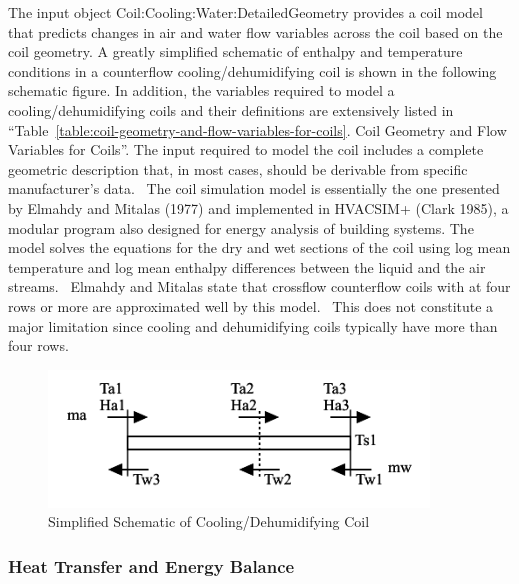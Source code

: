 The input object Coil:Cooling:Water:DetailedGeometry provides a coil model that predicts changes in air and water flow variables across the coil based on the coil geometry. A greatly simplified schematic of enthalpy and temperature conditions in a counterflow cooling/dehumidifying coil is shown in the following schematic figure. In addition, the variables required to model a cooling/dehumidifying coils and their definitions are extensively listed in ``Table~\ref{table:coil-geometry-and-flow-variables-for-coils}. Coil Geometry and Flow Variables for Coils''. The input required to model the coil includes a complete geometric description that, in most cases, should be derivable from specific manufacturer's data.~ The coil simulation model is essentially the one presented by Elmahdy and Mitalas (1977) and implemented in HVACSIM+ (Clark 1985), a modular program also designed for energy analysis of building systems. The model solves the equations for the dry and wet sections of the coil using log mean temperature and log mean enthalpy differences between the liquid and the air streams.~ Elmahdy and Mitalas state that crossflow counterflow coils with at four rows or more are approximated well by this model.~ This does not constitute a major limitation since cooling and dehumidifying coils typically have more than four rows.

\begin{figure}[hbtp] %
\centering
\includegraphics[width=0.9\textwidth, height=0.9\textheight, keepaspectratio=true]{media/image3352.svg.png}
\caption{Simplified Schematic of Cooling/Dehumidifying Coil \protect \label{fig:simplified-schematic-of-coolingdehumidifying-001}}
\end{figure}

\subsubsection{Heat Transfer and Energy Balance}\label{heat-transfer-and-energy-balance-1}

